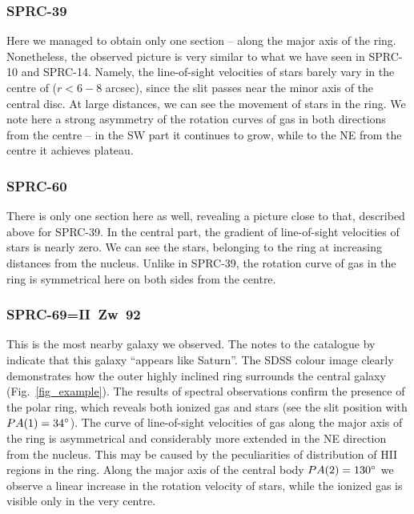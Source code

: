 \documentclass[useAMS,usenatbib]{mn2e}
\begin{document}
\subsubsection{SPRC-39}

Here we managed to obtain only one section -- along the major axis
of the ring. Nonetheless, the observed picture is very similar to
what we have seen in SPRC-10  and SPRC-14. Namely, the line-of-sight
velocities of stars barely vary in the centre of ($r<6-8$ arcsec),
since the slit passes near the minor axis of the central disc. At
large distances, we can see the movement of stars in the ring. We
note here a strong asymmetry of the rotation curves of gas in both
directions from the centre -- in the SW part it continues to grow,
while to the NE from the centre it achieves plateau.



\subsubsection{SPRC-60}

There is only one section here as well, revealing a picture close
to that, described above for SPRC-39. In the central part, the
gradient of line-of-sight velocities of stars is nearly zero. We can see
the stars, belonging to the ring at increasing distances from the
nucleus. Unlike in SPRC-39, the rotation curve of gas in the ring
is symmetrical here on both sides from the centre.



\subsubsection{SPRC-69=II~Zw~92}

This is the most nearby galaxy we observed. The notes to the
catalogue by \citet{Zwicky1971} indicate that this galaxy ``appears
like Saturn''. The SDSS colour image clearly demonstrates how the
outer highly inclined ring surrounds the central galaxy
(Fig.~\ref{fig_example}). The results of spectral observations
confirm the presence of the polar ring, which reveals both ionized
gas and stars (see the   slit position with $PA(1)=34\hbox{$^\circ$}$). The curve
of line-of-sight velocities of gas along the major axis of the ring is
asymmetrical and considerably more extended in the NE direction
from the nucleus. This may be caused by the peculiarities of
distribution of HII regions in the ring. Along the major axis of
the central body $PA(2)=130\hbox{$^\circ$}$ we observe a linear increase in
the rotation velocity of stars, while the ionized gas is visible
only in the very centre.
\end{document}
